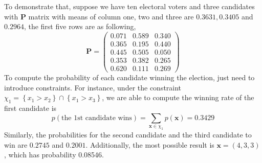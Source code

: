 \documentclass[12pt]{article}
\newcommand{\Pmat}{\mathbf{P}}
\begin{document}
To demonstrate that, suppose we have ten electoral voters and three candidates with $\Pmat$ matrix with means of column one, two and three are $0.3631,0.3405$ and $0.2964$, the first five rows are as following,
\begin{equation*}
    \Pmat = \begin{pmatrix}
0.071 & 0.589 & 0.340\\
0.365 & 0.195 & 0.440\\
0.445 & 0.505 & 0.050\\
0.353 & 0.382 & 0.265\\
0.620 & 0.111 & 0.269
    \end{pmatrix}
\end{equation*}
To compute the probability of each candidate winning the election, just need to introduce constraints. For instance, under the constraint $\chi_1 = \left\{x_1>x_2\right\} \cap \left\{x_1>x_3\right\}$, we are able to compute the winning rate of the first candidate is
\begin{equation*}
    p(\text{the 1st candidate wins}) = \sum_{\boldsymbol{x} \in \chi_{1}} p(\boldsymbol{x}) = 0.3429
\end{equation*}
Similarly, the probabilities for the second candidate and the third candidate to win are $0.2745$ and $0.2001$. Additionally, the most possible result is $\boldsymbol{x} = (4,3,3)$, which has probability 0.08546.




\end{document}
